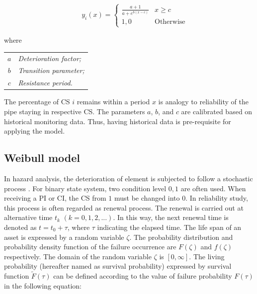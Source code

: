 \begin{eqnarray}
&& y_i(x)=\left\{
\begin{array}{ll}
\frac{a+1}{a+e^{b(x-c)}} & x \geq c\\
1,0 & \text{Otherwise}
\end{array}
\right.
\end{eqnarray}

where\\
\begin{table}[h]
	\hspace*{1.0cm}
	{\footnotesize
		\begin{tabular}{l|l}
			\multicolumn{1}{c}{$a$} & \textit{Deterioration factor;}  \\ 
			\multicolumn{1}{c}{$b$} & \textit{Transition parameter;}  \\ 
			\multicolumn{1}{c}{$c$} &\textit{ Resistance period. } \\ 						
		\end{tabular}
	}
\end{table}

The percentage of CS $i$ remains within a period $x$ is analogy to reliability of the pipe staying in respective CS. The parameters $a$, $b$, and $c$ are calibrated based on historical monitoring data. Thus, having historical data is pre-requisite for applying the model.



\subsection{Weibull model} \label{ch03:weibullmodel}

In hazard analysis, the deterioration of element is subjected to follow a stochastic process \cite{lancaster90}. For binary state system, two condition level $0, 1$ are often used. When receiving a PI or CI, the CS from $1$ must be changed into $0$. In reliability study, this process is often regarded as renewal process. The renewal is carried out at alternative time $t_k$ $(k=0,1,2,...)$. In this way, the next renewal time is denoted as $t=t_0+\tau$, where $\tau$ indicating the elapsed time. The life span of an asset is expressed by a random variable $\zeta$. The probability distribution and probability density function of the failure occurrence are $F(\zeta)$ and $f(\zeta)$ respectively. The domain of the random variable $\zeta$ is $[0,\infty]$. The living probability (hereafter named as survival probability) expressed by survival function $\tilde{F}(\tau)$ can be defined according to the value of failure probability $F(\tau)$ in the following equation:

